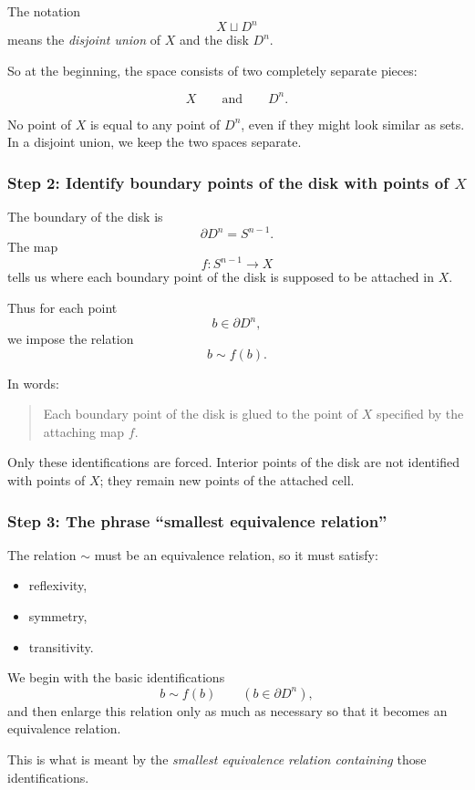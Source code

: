 \documentclass[12pt,a4paper]{article}
\theoremstyle{notespace}
\begin{document}
The notation
\[
X\sqcup D^n
\]
means the \emph{disjoint union} of \(X\) and the disk \(D^n\).

So at the beginning, the space consists of two completely separate pieces:

\[
X
\qquad\text{and}\qquad
D^n.
\]

No point of \(X\) is equal to any point of \(D^n\), even if they might look similar as sets. In a disjoint union, we keep the two spaces separate.

\subsubsection{Step 2: Identify boundary points of the disk with points of \(X\)}

The boundary of the disk is
\[
\partial D^n=S^{n-1}.
\]
The map
\[
f:S^{n-1}\to X
\]
tells us where each boundary point of the disk is supposed to be attached in \(X\).

Thus for each point
\[
b\in \partial D^n,
\]
we impose the relation
\[
b\sim f(b).
\]

In words:

\begin{quote}
	Each boundary point of the disk is glued to the point of \(X\) specified by the attaching map \(f\).
\end{quote}

Only these identifications are forced. Interior points of the disk are not identified with points of \(X\); they remain new points of the attached cell.

\subsubsection{Step 3: The phrase ``smallest equivalence relation''}

The relation \(\sim\) must be an equivalence relation, so it must satisfy:

\begin{itemize}
	\item reflexivity,
	\item symmetry,
	\item transitivity.
\end{itemize}

We begin with the basic identifications
\[
b\sim f(b)
\qquad
(b\in \partial D^n),
\]
and then enlarge this relation only as much as necessary so that it becomes an equivalence relation.

This is what is meant by the \emph{smallest equivalence relation containing} those identifications.
\end{document}
